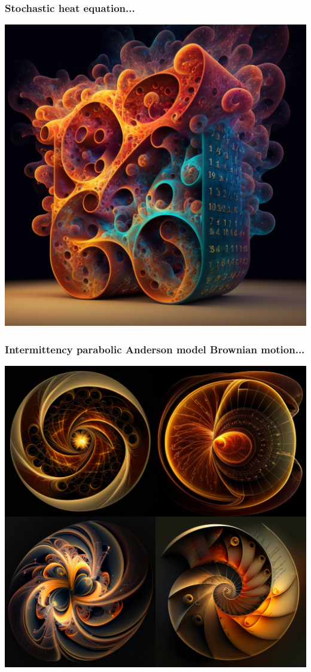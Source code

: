 \documentclass[9pt,table,xcolor=dvipsnames]{beamer}%
\theoremstyle{definition}
\theoremstyle{plain}
\begin{document}
\begin{frame}[fragile,t] %
  \frametitle{Stochastic heat equation...}
  \begin{center}
    \includegraphics[scale=0.22]{./figs/chenle02_Stochastic_heat_equation.png}
  \end{center}
\end{frame}
\begin{frame}[fragile,t] %
  \frametitle{Intermittency parabolic Anderson model Brownian motion...}
  \begin{center}
    \includegraphics[scale=0.22]{./figs/chenle02_Intermittency_parabolic_Anderson_model_Brownian_motion.png}
  \end{center}
\end{frame}
\end{document}
